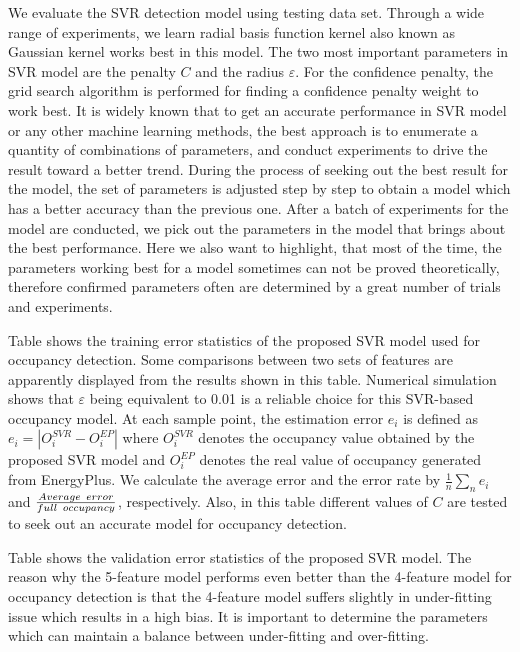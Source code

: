 We evaluate the SVR detection model using
testing data set. Through a wide range of experiments, we learn radial
basis function kernel also known as Gaussian kernel works best in this
model. \textcolor{feb18rev}{The two most important parameters in SVR model 
are the penalty $C$ and the radius $\varepsilon$. For the confidence penalty,
the grid search algorithm \cite{Hsu2003} is performed for finding a confidence
penalty weight to work best.}
It is widely known that to get an accurate performance in SVR model or any other machine
learning methods, the best approach is to enumerate a quantity of
combinations of parameters, and conduct experiments to drive the
result toward a better trend. During the process of seeking out the
best result for the model, the set of parameters is adjusted step by
step to obtain a model which has a better accuracy than the previous
one. After a batch of experiments for the model are conducted, we pick
out the parameters in the model that brings about the best
performance. Here we also want to highlight, that most of the time,
the parameters working best for a model sometimes can not be proved
theoretically, therefore confirmed parameters often are determined by
a great number of trials and experiments.

Table  shows the training error statistics of the proposed SVR
model used for occupancy detection. Some comparisons between two sets
of features are apparently displayed from the results shown in this
table. Numerical simulation shows that $\varepsilon$ being equivalent
to 0.01 is a reliable choice for this SVR-based occupancy model. At
each sample point, the estimation error ${e_i}$ is defined as
${e_i} = \left| {O_i^{SVR} - O_i^{EP}} \right|$ where $O_i^{SVR}$
denotes the occupancy value obtained by the proposed SVR model and
$O_i^{EP}$ denotes the real value of occupancy generated from EnergyPlus. We calculate the average error and the error rate by
$\frac{1}{n}\sum\nolimits_n {{e_i}}$ and
$\frac{{Average{\kern 1pt} {\kern 1pt} {\kern 1pt} {\kern 1pt}
    error}}{{full{\kern 1pt} {\kern 1pt} {\kern 1pt} {\kern 1pt}
    occupancy}}$,
respectively. Also, in this table different values of $C$ are tested
to seek out an accurate model for occupancy detection.

Table  shows the validation error statistics of the proposed SVR model. The reason why the 5-feature model performs even better than the 4-feature model for occupancy detection is that the 4-feature model suffers slightly in under-fitting issue which results in a high bias. It is important to determine the parameters which can maintain a balance between under-fitting and over-fitting.


